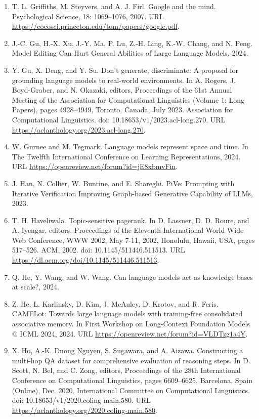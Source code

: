 \documentclass[11pt,UTF8,fontset=fandol]{ctexart}
\begin{document}
\begin{enumerate}[leftmargin=2em]
\item T. L. Griffiths, M. Steyvers, and A. J. Firl. Google and the mind. Psychological Science, 18: 1069--1076, 2007. URL \url{https://cocosci.princeton.edu/tom/papers/google.pdf}.
\item J.-C. Gu, H.-X. Xu, J.-Y. Ma, P. Lu, Z.-H. Ling, K.-W. Chang, and N. Peng. Model Editing Can Hurt General Abilities of Large Language Models, 2024.
\item Y. Gu, X. Deng, and Y. Su. Don't generate, discriminate: A proposal for grounding language models to real-world environments. In A. Rogers, J. Boyd-Graber, and N. Okazaki, editors, Proceedings of the 61st Annual Meeting of the Association for Computational Linguistics (Volume 1: Long Papers), pages 4928--4949, Toronto, Canada, July 2023. Association for Computational Linguistics. doi: 10.18653/v1/2023.acl-long.270. URL \url{https://aclanthology.org/2023.acl-long.270}.
\item W. Gurnee and M. Tegmark. Language models represent space and time. In The Twelfth International Conference on Learning Representations, 2024. URL \url{https://openreview.net/forum?id=jE8xbmvFin}.
\item J. Han, N. Collier, W. Buntine, and E. Shareghi. PiVe: Prompting with Iterative Verification Improving Graph-based Generative Capability of LLMs, 2023.
\item T. H. Haveliwala. Topic-sensitive pagerank. In D. Lassner, D. D. Roure, and A. Iyengar, editors, Proceedings of the Eleventh International World Wide Web Conference, WWW 2002, May 7-11, 2002, Honolulu, Hawaii, USA, pages 517--526. ACM, 2002. doi: 10.1145/511446.511513. URL \url{https://dl.acm.org/doi/10.1145/511446.511513}.
\item Q. He, Y. Wang, and W. Wang. Can language models act as knowledge bases at scale?, 2024.
\item Z. He, L. Karlinsky, D. Kim, J. McAuley, D. Krotov, and R. Feris. CAMELot: Towards large language models with training-free consolidated associative memory. In First Workshop on Long-Context Foundation Models @ ICML 2024, 2024. URL \url{https://openreview.net/forum?id=VLDTzg1a4Y}.
\item X. Ho, A.-K. Duong Nguyen, S. Sugawara, and A. Aizawa. Constructing a multi-hop QA dataset for comprehensive evaluation of reasoning steps. In D. Scott, N. Bel, and C. Zong, editors, Proceedings of the 28th International Conference on Computational Linguistics, pages 6609--6625, Barcelona, Spain (Online), Dec. 2020. International Committee on Computational Linguistics. doi: 10.18653/v1/2020.coling-main.580. URL \url{https://aclanthology.org/2020.coling-main.580}.

\end{enumerate}
\end{document}
